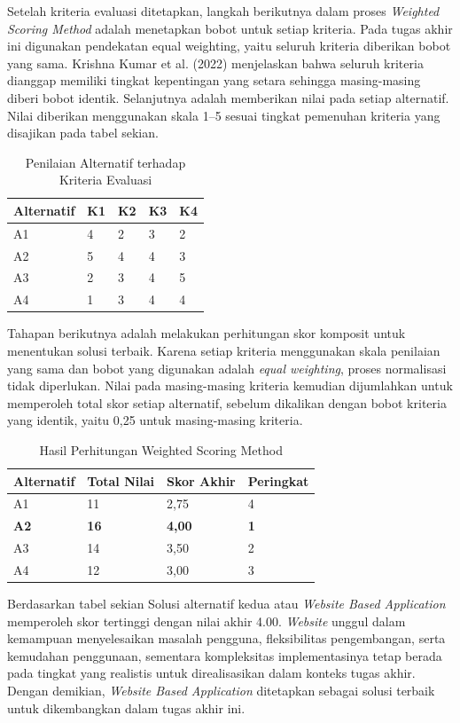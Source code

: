 Setelah kriteria evaluasi ditetapkan, langkah berikutnya dalam proses \textit{Weighted Scoring Method} adalah menetapkan bobot untuk setiap kriteria. Pada tugas akhir ini digunakan pendekatan equal weighting, yaitu seluruh kriteria diberikan bobot yang sama. Krishna Kumar et al. (2022) menjelaskan bahwa seluruh kriteria dianggap memiliki tingkat kepentingan yang setara sehingga masing-masing diberi bobot identik. Selanjutnya adalah memberikan nilai pada setiap alternatif. Nilai diberikan menggunakan skala 1–5 sesuai tingkat pemenuhan kriteria yang disajikan pada tabel sekian.
\begin{table}[h]
\centering
\begin{tabular}{|p{2cm}|p{2cm}|p{2cm}|p{2cm}|p{2cm}|}
\hline
\textbf{Alternatif} & \textbf{K1} & \textbf{K2} & \textbf{K3} & \textbf{K4} \\
\hline
A1 & 4 & 2 & 3 & 2 \\
\hline
A2 & 5 & 4 & 4 & 3 \\
\hline
A3 & 2 & 3 & 4 & 5 \\
\hline
A4 & 1 & 3 & 4 & 4 \\
\hline
\end{tabular}
\caption{Penilaian Alternatif terhadap Kriteria Evaluasi}
\label{tbl:penilaian-alternatif}
\end{table}

Tahapan berikutnya adalah melakukan perhitungan skor komposit untuk menentukan solusi terbaik. Karena setiap kriteria menggunakan skala penilaian yang sama dan bobot yang digunakan adalah \textit{equal weighting}, proses normalisasi tidak diperlukan. Nilai pada masing-masing kriteria kemudian dijumlahkan untuk memperoleh total skor setiap alternatif, sebelum dikalikan dengan bobot kriteria yang identik, yaitu 0,25 untuk masing-masing kriteria. 
\begin{table}[h]
\centering
\begin{tabular}{|p{2cm}|p{3cm}|p{3cm}|p{2cm}|}
\hline
\textbf{Alternatif} & \textbf{Total Nilai} & \textbf{Skor Akhir} & \textbf{Peringkat} \\
\hline
A1 & 11 & 2,75 & 4 \\
\hline
\textbf{A2} & \textbf{16} & \textbf{4,00} & \textbf{1} \\
\hline
A3 & 14 & 3,50 & 2 \\
\hline
A4 & 12 & 3,00 & 3 \\
\hline
\end{tabular}
\caption{Hasil Perhitungan Weighted Scoring Method}
\label{tbl:wsm-hasil}
\end{table}

Berdasarkan tabel sekian Solusi alternatif kedua atau \textit{Website Based Application}  memperoleh skor tertinggi dengan nilai akhir 4.00. \textit{Website} unggul dalam kemampuan menyelesaikan masalah pengguna, fleksibilitas pengembangan, serta kemudahan penggunaan, sementara kompleksitas implementasinya tetap berada pada tingkat yang realistis untuk direalisasikan dalam konteks tugas akhir. Dengan demikian, \textit{Website Based Application} ditetapkan sebagai solusi terbaik untuk dikembangkan dalam tugas akhir ini.
